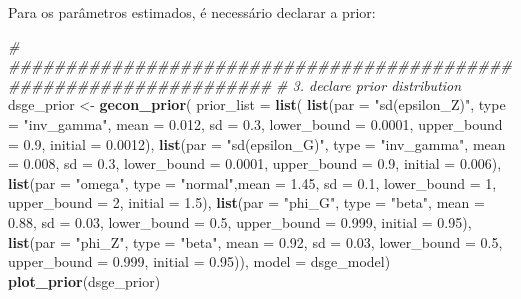 \documentclass[12pt,a4paper,]{article}
\newcommand{\0}{\mathbf{0}}
\newenvironment{Shaded}{\begin{snugshade}}{\end{snugshade}}
\newcommand{\CommentTok}[1]{\textcolor[rgb]{0.56,0.35,0.01}{\textit{#1}}}
\newcommand{\DataTypeTok}[1]{\textcolor[rgb]{0.13,0.29,0.53}{#1}}
\newcommand{\DecValTok}[1]{\textcolor[rgb]{0.00,0.00,0.81}{#1}}
\newcommand{\FloatTok}[1]{\textcolor[rgb]{0.00,0.00,0.81}{#1}}
\newcommand{\KeywordTok}[1]{\textcolor[rgb]{0.13,0.29,0.53}{\textbf{#1}}}
\newcommand{\NormalTok}[1]{#1}
\newcommand{\StringTok}[1]{\textcolor[rgb]{0.31,0.60,0.02}{#1}}
\begin{document}
Para os parâmetros estimados, é necessário declarar a prior:

\begin{Shaded}
\begin{Highlighting}[]
\CommentTok{# ###################################################################}
\CommentTok{# 3. declare prior distribution}
\NormalTok{dsge_prior <-}\StringTok{ }\KeywordTok{gecon_prior}\NormalTok{(}
  \DataTypeTok{prior_list =} \KeywordTok{list}\NormalTok{(}
    \KeywordTok{list}\NormalTok{(}\DataTypeTok{par =} \StringTok{"sd(epsilon_Z)"}\NormalTok{, }\DataTypeTok{type =} \StringTok{"inv_gamma"}\NormalTok{,}
         \DataTypeTok{mean =} \FloatTok{0.012}\NormalTok{, }\DataTypeTok{sd =} \FloatTok{0.3}\NormalTok{, }\DataTypeTok{lower_bound =} \FloatTok{0.0001}\NormalTok{,}
         \DataTypeTok{upper_bound =} \FloatTok{0.9}\NormalTok{, }\DataTypeTok{initial =} \FloatTok{0.0012}\NormalTok{),}
    \KeywordTok{list}\NormalTok{(}\DataTypeTok{par =} \StringTok{"sd(epsilon_G)"}\NormalTok{, }\DataTypeTok{type =} \StringTok{"inv_gamma"}\NormalTok{,}
         \DataTypeTok{mean =} \FloatTok{0.008}\NormalTok{, }\DataTypeTok{sd =} \FloatTok{0.3}\NormalTok{, }\DataTypeTok{lower_bound =} \FloatTok{0.0001}\NormalTok{,}
         \DataTypeTok{upper_bound =} \FloatTok{0.9}\NormalTok{, }\DataTypeTok{initial =} \FloatTok{0.006}\NormalTok{),}
    \KeywordTok{list}\NormalTok{(}\DataTypeTok{par =} \StringTok{"omega"}\NormalTok{, }\DataTypeTok{type =} \StringTok{"normal"}\NormalTok{,}\DataTypeTok{mean =} \FloatTok{1.45}\NormalTok{, }\DataTypeTok{sd =} \FloatTok{0.1}\NormalTok{, }\DataTypeTok{lower_bound =} \DecValTok{1}\NormalTok{,}
         \DataTypeTok{upper_bound =} \DecValTok{2}\NormalTok{, }\DataTypeTok{initial =} \FloatTok{1.5}\NormalTok{),}
    \KeywordTok{list}\NormalTok{(}\DataTypeTok{par =} \StringTok{"phi_G"}\NormalTok{, }\DataTypeTok{type =} \StringTok{"beta"}\NormalTok{,}
         \DataTypeTok{mean =} \FloatTok{0.88}\NormalTok{, }\DataTypeTok{sd =} \FloatTok{0.03}\NormalTok{, }\DataTypeTok{lower_bound =} \FloatTok{0.5}\NormalTok{,}
         \DataTypeTok{upper_bound =} \FloatTok{0.999}\NormalTok{, }\DataTypeTok{initial =} \FloatTok{0.95}\NormalTok{),}
    \KeywordTok{list}\NormalTok{(}\DataTypeTok{par =} \StringTok{"phi_Z"}\NormalTok{, }\DataTypeTok{type =} \StringTok{"beta"}\NormalTok{,}
         \DataTypeTok{mean =} \FloatTok{0.92}\NormalTok{, }\DataTypeTok{sd =} \FloatTok{0.03}\NormalTok{, }\DataTypeTok{lower_bound =} \FloatTok{0.5}\NormalTok{,}
         \DataTypeTok{upper_bound =} \FloatTok{0.999}\NormalTok{, }\DataTypeTok{initial =} \FloatTok{0.95}\NormalTok{)),}
  \DataTypeTok{model =}\NormalTok{ dsge_model)}
\KeywordTok{plot_prior}\NormalTok{(dsge_prior)}
\end{Highlighting}
\end{Shaded}
\end{document}
